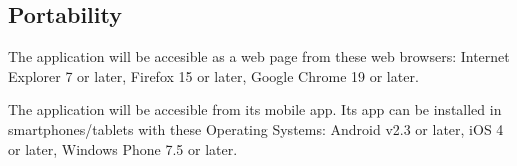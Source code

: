 \subsection{Portability}
\begin{NFrequirement}{}
The application will be accesible as a web page from these web browsers: Internet Explorer 7 or later, Firefox 15 or later, Google Chrome 19 or later. 
\end{NFrequirement}
\begin{NFrequirement}{}
The application will be accesible from its mobile app. Its app can be installed in smartphones/tablets with these Operating Systems: Android v2.3 or later, iOS 4 or later, Windows Phone 7.5 or later.
\end{NFrequirement}






